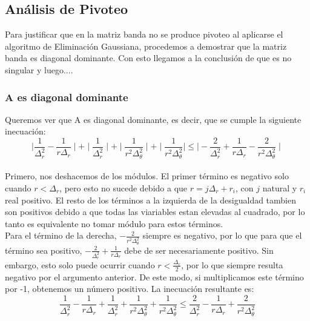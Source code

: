 
\subsection{Análisis de Pivoteo}

Para justificar que en la matriz banda no se produce pivoteo al aplicarse el algoritmo de Eliminación Gaussiana, procedemos a demostrar que la matriz banda es diagonal dominante. Con esto llegamos a la conclusión de que es no singular y luego....



\subsubsection{A es diagonal dominante}
Queremos ver que A es diagonal dominante, es decir, que se cumple la siguiente inecuación:\\
$$\mid \frac{1}{\Delta^2_r}-\frac{1}{r \Delta_r}\mid +
\mid \frac{1}{\Delta^2_r} \mid + 
\mid \frac{1}{r^2 \Delta^2_\theta} \mid +
\mid \frac{1}{r^2 \Delta^2_\theta} \mid
\leq \mid -\frac{2}{\Delta^2_r}+\frac{1}{r \Delta_r}-\frac{2}{r^2 \Delta^2_\theta} \mid$$  \\
Primero, nos deshacemos de los módulos. El primer término es negativo solo cuando $r < {\Delta_r}$, pero esto no sucede debido a que $r= j \Delta_r + r_i$, con $j$ natural y $r_i$ real positivo. El resto de los términos a la izquierda de la desigualdad tambien son positivos debido a que todas las viariables estan elevadas al cuadrado, por lo tanto es equivalente no tomar módulo para estos términos. \\
Para el término de la derecha, $-\frac{2}{r^2 \Delta^2_\theta}$ siempre es negativo, por lo que para que el término sea positivo, $-\frac{2}{\Delta^2_r}+\frac{1}{r \Delta_r}$ debe de ser necesariamente positivo. Sin embargo, esto solo puede ocurrir cuando $r < \frac{\Delta_r}{2}$, por lo que siempre resulta negativo por el argumento anterior. De este modo, si multiplicamos este término por -1, obtenemos un número positivo. La inecuación resultante es: \\ 
$$ \frac{1}{\Delta^2_r}-\frac{1}{r \Delta_r} +  
\frac{1}{\Delta^2_r} + 
\frac{1}{r^2 \Delta^2_\theta} +
\frac{1}{r^2 \Delta^2_\theta}
\leq \frac{2}{\Delta^2_r}-\frac{1}{r \Delta_r}+\frac{2}{r^2 \Delta^2_\theta}$$ \\

